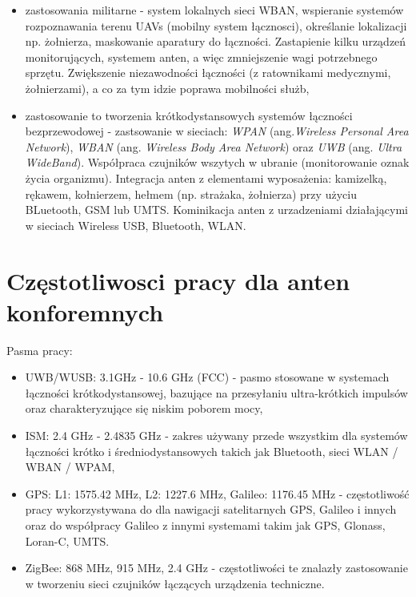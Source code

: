\begin{itemize}
\begin{itemize}
\begin{itemize}
	\item zastosowania militarne - system lokalnych sieci WBAN, wspieranie systemów rozpoznawania terenu UAVs (mobilny system łącznosci), określanie lokalizacji np. żołnierza, maskowanie aparatury do łączności.
	Zastapienie kilku urządzeń monitorujących, systemem anten, a więc zmniejszenie wagi potrzebnego sprzętu. Zwiększenie niezawodności łączności (z ratownikami medycznymi, żołnierzami), a co za tym idzie poprawa mobilności służb,      

	\item zastosowanie to tworzenia krótkodystansowych systemów łączności bezprzewodowej - zastsowanie w sieciach: \emph{WPAN} (ang.\emph{Wireless Personal Area Network}), \emph{WBAN} (ang. \emph{Wireless Body Area Network}) oraz \emph{UWB} (ang. \emph{Ultra WideBand}). Współpraca czujników wszytych w ubranie (monitorowanie oznak życia organizmu). Integracja anten z elementami wyposażenia: kamizelką, rękawem, kołnierzem, hełmem (np. strażaka, żołnierza) przy użyciu BLuetooth, GSM lub UMTS. Kominikacja anten z urzadzeniami działającymi w sieciach Wireless USB, Bluetooth, WLAN.  

\end{itemize}
	

\section{Częstotliwosci pracy dla anten konforemnych}

Pasma pracy:

\begin{itemize}\setlength{\itemsep}{0pt}
	
	\item UWB/WUSB: 3.1GHz - 10.6 GHz (FCC) - pasmo stosowane w systemach łączności krótkodystansowej, bazujące na przesyłaniu ultra-krótkich impulsów oraz charakteryzujące się niskim poborem mocy,

	\item ISM: 2.4 GHz - 2.4835 GHz - zakres używany przede wszystkim dla systemów łączności krótko i średniodystansowych takich jak Bluetooth, sieci WLAN / WBAN / WPAM,

	\item GPS: L1: 1575.42 MHz, L2: 1227.6 MHz, Galileo: 1176.45 MHz - częstotliwość pracy wykorzystywana do dla nawigacji satelitarnych GPS, Galileo i innych oraz do współpracy Galileo z innymi systemami takim jak GPS, Glonass, Loran-C, UMTS.

	\item ZigBee: 868 MHz, 915 MHz, 2.4 GHz - częstotliwości te znalazły zastosowanie w tworzeniu sieci czujników łączących urządzenia techniczne.


\end{itemize}
\end{itemize}
\end{itemize}
